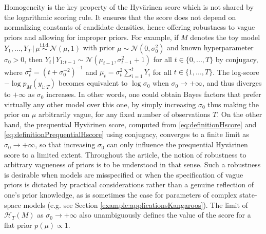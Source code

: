 \documentclass[12pt]{article}
\theoremstyle{plain}
\theoremstyle{definition}
\begin{document}
	Homogeneity is the key property of the Hyv{\"a}rinen score which is not shared by the logarithmic scoring rule. 
	It ensures that the score does not
	depend on normalizing constants of candidate densities, hence offering robustness to vague priors and allowing for improper priors.
	For example, if $M$ denotes the toy model $Y_1,...,Y_T\,|\,\mu \stackrel{\text{i.i.d.}}{\sim} \mathcal{N}(\mu,1)$ with prior $\mu \sim \mathcal{N}(0,\sigma_0^2)$ 
	and known hyperparameter $\sigma_0>0$, then $Y_t \,|\, Y_{1:t-1} \sim \mathcal{N}\left(\mu_{t-1},\sigma_{t-1}^{2}+1\right)$ for all $t\in\{0,...,T\}$ by conjugacy,
	where
	$\sigma_t^2=(t+\sigma_0^{-2})^{-1}$ and 
	$\mu_t=\sigma_t^2 \sum_{i=1}^t Y_i$ for all $t\in\{1,...,T\}$.
	The log-score $-\log p_M(y_{1:T})$ becomes equivalent to $\log \sigma_0$ when
	$\sigma_0 \to +\infty$, and thus diverges to $+\infty$ as $\sigma_0$ increases.
	In other words, one could obtain Bayes factors that prefer virtually any
	other model over this one, by simply increasing $\sigma_0$ thus making the prior on $\mu$ arbitrarily
	vague, for any fixed number of observations $T$. 
	On the other hand, the prequential Hyv{\"a}rinen score, computed from \eqref{eq:definitionHscore} and \eqref{eq:definitionPrequentialHscore} using conjugacy, 
	converges to a finite limit as $\sigma_0\to+\infty$, so that increasing
	$\sigma_0$ can only influence the prequential Hyv{\"a}rinen score to a limited
	extent. Throughout the article, the notion of robustness to arbitrary vagueness of
	priors is to be understood in that sense. Such a robustness is desirable when models are misspecified or when the specification of vague priors is dictated by practical considerations rather than a genuine reflection of one's prior knowledge, as is sometimes the case for parameters of complex state-space models (e.g.\! see Section \ref{example:applicationsKangaroos}). The limit of $\mathcal{H}_{T}(M)$ as
	$\sigma_0 \to+\infty$ also unambiguously defines the value of the score for a flat prior $p(\mu)\propto 1$. 
	
\end{document}
